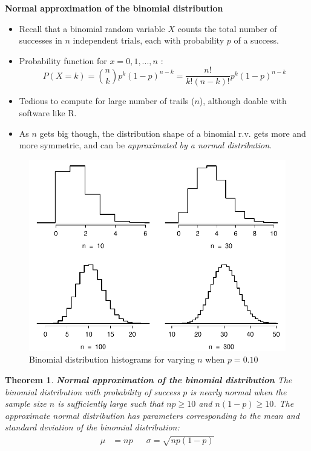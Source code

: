 \documentclass[12pt]{amsart}
\newtheorem{theorem}{Theorem}[section]
\begin{document}
{\newpage
\textbf{Normal approximation of the binomial distribution} \newline


\begin{itemize}
\item Recall that a binomial random variable $X$ counts the total number of successes in $n$ independent trials, each with probability $p$ of a success. 
\item Probability function for $x = 0, 1, ..., n$ :
$$P(X = k) = {n\choose k}p^k(1-p)^{n-k} = \frac{n!}{k!(n-k)!}p^k(1-p)^{n-k}$$
\item Tedious to compute for large number of trails ($n$), although doable with software like R. 
\item As $n$ gets big though, the distribution shape of a binomial r.v. gets more and more symmetric, and can be \textit{approximated by a normal distribution}.
\end{itemize}




\begin{figure}[h!]
  \includegraphics[width=5in]{img/fourBinomialModelsShowingApproxToNormal.pdf}
  \caption{Binomial distribution histograms for varying $n$ when $p=0.10$}
\end{figure}



\begin{theorem}\textbf{Normal approximation of the binomial distribution}\newline
The binomial distribution with probability of success $p$ is nearly normal when the sample size $n$ is sufficiently large such that $np \geq 10$ and $n(1-p)\geq 10$. \newline
The approximate normal distribution has parameters corresponding to the mean and standard deviation of the binomial distribution:
\begin{align*}
\mu &= np
&&\sigma= \sqrt{np(1-p)}
\end{align*}
\end{theorem}


}
\end{document}
